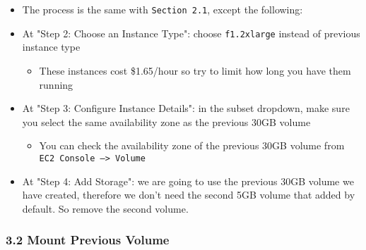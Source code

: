\documentclass[]{article}
\begin{document}
\begin{itemize}
\item
  The process is the same with \texttt{Section\ 2.1}, except the
  following:
\item
  At "Step 2: Choose an Instance Type": choose \texttt{f1.2xlarge}
  instead of previous instance type

  \begin{itemize}
  \item
    These instances cost \$1.65/hour so try to limit how long you have
    them running
  \end{itemize}
\item
  At "Step 3: Configure Instance Details": in the subset dropdown, make
  sure you select the same availability zone as the previous 30GB volume

  \begin{itemize}
  \item
    You can check the availability zone of the previous 30GB volume from
    \texttt{EC2\ Console\ —\textgreater{}\ Volume}
  \end{itemize}
\item
  At "Step 4: Add Storage": we are going to use the previous 30GB volume
  we have created, therefore we don't need the second 5GB volume that
  added by default. So remove the second volume.
\end{itemize}

\hypertarget{header-n441}{%
\subsubsection{3.2 Mount Previous Volume}\label{header-n441}}
\end{document}
